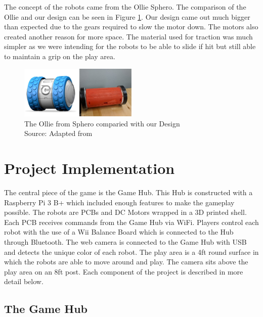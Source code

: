 \documentclass[11pt]{ieeeconf}
\begin{document}
The concept of the robots came from the Ollie Sphero. The comparison of the Ollie and our design can be seen in Figure \ref{Ollie}. Our design came out much bigger than expected due to the gears required to slow the motor down. The motors also created another reason for more space. The material used for traction was much simpler as we were intending for the robots to be able to slide if hit but still able to maintain a grip on the play area.

\begin{figure}[H]
\centering
\captionsetup{justification=centering}
\includegraphics[width=0.5\textwidth]{images/SideBySide.png}
\caption{The Ollie from Sphero comparied with our Design\\Source: Adapted from \cite{ollie:19}}
\label{Ollie}
\end{figure}


\section{Project Implementation}

The central piece of the game is the Game Hub. This Hub is constructed with a Raspberry Pi 3 B+ which included enough features to make the gameplay possible. The robots are PCBs and DC Motors wrapped in a 3D printed shell. Each PCB receives commands from the Game Hub via WiFi. Players control each robot with the use of a Wii Balance Board which is connected to the Hub through Bluetooth. The web camera is connected to the Game Hub with USB and detects the unique color of each robot. The play area is a 4ft round surface in which the robots are able to move around and play. The camera sits above the play area on an 8ft post. Each component of the project is described in more detail below. 

\subsection{The Game Hub}
\end{document}
